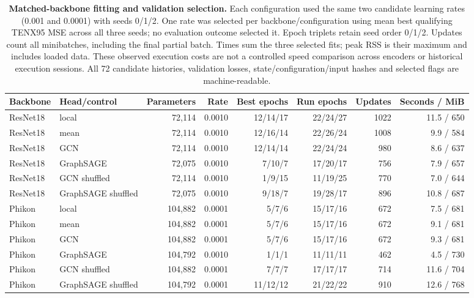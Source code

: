 \begin{table}[p]
\centering
\caption{\textbf{Matched-backbone fitting and validation selection.} Each configuration used the same two candidate learning rates (0.001 and 0.0001) with seeds 0/1/2. One rate was selected per backbone/configuration using mean best qualifying TENX95 MSE across all three seeds; no evaluation outcome selected it. Epoch triplets retain seed order 0/1/2. Updates count all minibatches, including the final partial batch. Times sum the three selected fits; peak RSS is their maximum and includes loaded data. These observed execution costs are not a controlled speed comparison across encoders or historical execution sessions. All 72 candidate histories, validation losses, state/configuration/input hashes and selected flags are machine-readable.}
\label{tab:backbone_resources}
\scriptsize\setlength{\tabcolsep}{3pt}
\begin{tabular}{llrrrrrr}\toprule
Backbone & Head/control & Parameters & Rate & Best epochs & Run epochs & Updates & Seconds / MiB\\\midrule
ResNet18 & local & 72,114 & 0.0010 & 12/14/17 & 22/24/27 & 1022 & 11.5 / 650\\
ResNet18 & mean & 72,114 & 0.0010 & 12/16/14 & 22/26/24 & 1008 & 9.9 / 584\\
ResNet18 & GCN & 72,114 & 0.0010 & 12/14/14 & 22/24/24 & 980 & 8.6 / 637\\
ResNet18 & GraphSAGE & 72,075 & 0.0010 & 7/10/7 & 17/20/17 & 756 & 7.9 / 657\\
ResNet18 & GCN shuffled & 72,114 & 0.0010 & 1/9/15 & 11/19/25 & 770 & 7.0 / 644\\
ResNet18 & GraphSAGE shuffled & 72,075 & 0.0010 & 9/18/7 & 19/28/17 & 896 & 10.8 / 687\\
Phikon & local & 104,882 & 0.0001 & 5/7/6 & 15/17/16 & 672 & 7.5 / 681\\
Phikon & mean & 104,882 & 0.0001 & 5/7/6 & 15/17/16 & 672 & 9.1 / 681\\
Phikon & GCN & 104,882 & 0.0001 & 5/7/6 & 15/17/16 & 672 & 9.3 / 681\\
Phikon & GraphSAGE & 104,792 & 0.0010 & 1/1/1 & 11/11/11 & 462 & 4.5 / 730\\
Phikon & GCN shuffled & 104,882 & 0.0001 & 7/7/7 & 17/17/17 & 714 & 11.6 / 704\\
Phikon & GraphSAGE shuffled & 104,792 & 0.0001 & 11/12/12 & 21/22/22 & 910 & 12.6 / 768\\
\bottomrule\end{tabular}
\end{table}
